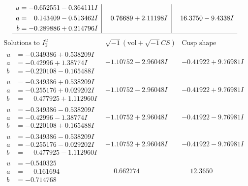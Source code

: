 \documentclass[1p]{elsarticle_modified}
\theoremstyle{definition}
\newcommand{\I}{\sqrt{-1}}
\begin{document}
$$\begin{array}{c|c|c}
\begin{aligned}
u &= -0.652551 - 0.364111 I \\
a &= \phantom{-}0.143409 - 0.513462 I \\
b &= -0.289886 + 0.214796 I\end{aligned}
 & \phantom{-}0.76689 + 2.11198 I & \phantom{-}16.3750 - 9.4338 I\\
 \hline 
 \end{array}$$\newpage$$\begin{array}{c|c|c}  
\text{Solutions to }I^u_{2}& \I (\text{vol} + \sqrt{-1}CS) & \text{Cusp shape}\\
 \hline 
\begin{aligned}
u &= -0.349386 + 0.538209 I \\
a &= -0.42996 + 1.38774 I \\
b &= -0.220108 - 0.165488 I\end{aligned}
 & -1.10752 - 2.96048 I & -0.41922 + 9.76981 I \\ \hline\begin{aligned}
u &= -0.349386 + 0.538209 I \\
a &= -0.255176 + 0.029202 I \\
b &= \phantom{-}0.477925 + 1.112960 I\end{aligned}
 & -1.10752 - 2.96048 I & -0.41922 + 9.76981 I \\ \hline\begin{aligned}
u &= -0.349386 - 0.538209 I \\
a &= -0.42996 - 1.38774 I \\
b &= -0.220108 + 0.165488 I\end{aligned}
 & -1.10752 + 2.96048 I & -0.41922 - 9.76981 I \\ \hline\begin{aligned}
u &= -0.349386 - 0.538209 I \\
a &= -0.255176 - 0.029202 I \\
b &= \phantom{-}0.477925 - 1.112960 I\end{aligned}
 & -1.10752 + 2.96048 I & -0.41922 - 9.76981 I \\ \hline\begin{aligned}
u &= -0.540325\phantom{ +0.000000I} \\
a &= \phantom{-}0.161694\phantom{ +0.000000I} \\
b &= -0.714768\phantom{ +0.000000I}\end{aligned}
 & \phantom{-}0.662774\phantom{ +0.000000I} & \phantom{-}12.3650\phantom{ +0.000000I} \\ \hline\begin{aligned}

\end{aligned}
\end{array}$$
\end{document}
